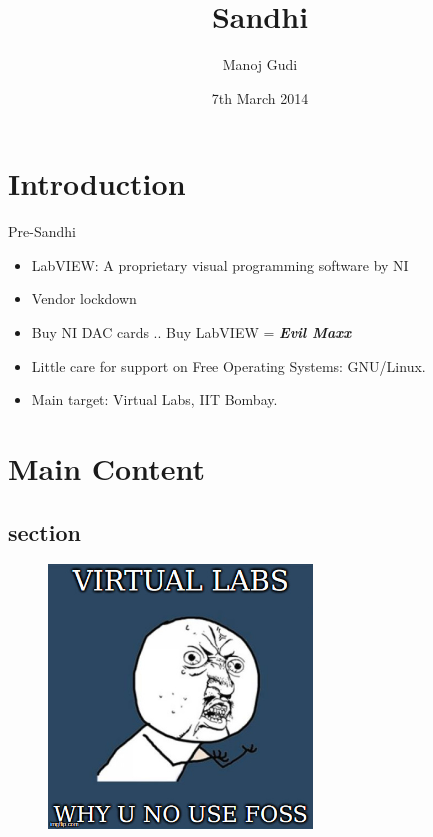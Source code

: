\documentclass{beamer}
\title[Sandhi]{Sandhi}
\author{Manoj Gudi}
\institute{R.A. FOSSEE | NME-ICT | IIT Bombay}
\date{7th March 2014}
\begin{document}
\begin{frame}
  \titlepage
\end{frame}


\section{Introduction}

\begin{frame}{Pre-Sandhi}

\begin{itemize}
  \item LabVIEW: A proprietary visual programming software by NI
  \item Vendor lockdown 
  \item Buy NI DAC cards .. Buy LabVIEW  = \textbf{ \textit{Evil Maxx}}
  \item Little care for support on Free Operating Systems: GNU/Linux.
  \item Main target: Virtual Labs, IIT Bombay.
\end{itemize}

\vskip 1cm

\end{frame}


\section{Main Content}

\vskip 1cm
\begin{frame}{}
\subsection{section}
\begin{figure} [ht!]
	\centering
	\includegraphics[width=70mm]{meme1.jpg}
\end{figure}
\end{frame}
\end{document}
